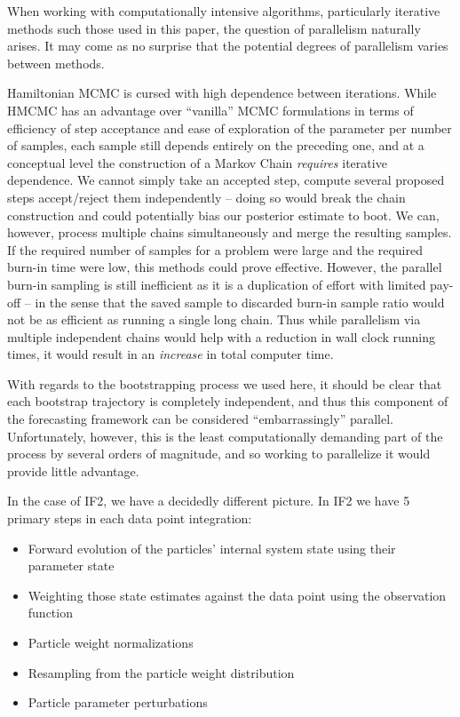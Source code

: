 	When working with computationally intensive algorithms, particularly iterative methods such those used in this paper, the question of parallelism naturally arises. It may come as no surprise that the potential degrees of parallelism varies between methods.

	Hamiltonian MCMC is cursed with high dependence between iterations. While HMCMC has an advantage over ``vanilla'' MCMC formulations in terms of efficiency of step acceptance and ease of exploration of the parameter per number of samples, each sample still depends entirely on the preceding one, and at a conceptual level the construction of a Markov Chain \textit{requires} iterative dependence. We cannot simply take an accepted step, compute several proposed steps accept/reject them independently -- doing so would break the chain construction and could potentially bias our posterior estimate to boot. We can, however, process multiple chains simultaneously and merge the resulting samples. If the required number of samples for a problem were large and the required burn-in time were low, this methods could prove effective. However, the parallel burn-in sampling is still inefficient as it is a duplication of effort with limited pay-off -- in the sense that the saved sample to discarded burn-in sample ratio would not be as efficient as running a single long chain. Thus while parallelism via multiple independent chains would help with a reduction in wall clock running times, it would result in an \textit{increase} in total computer time.

	With regards to the bootstrapping process we used here, it should be clear that each bootstrap trajectory is completely independent, and thus this component of the forecasting framework can be considered ``embarrassingly'' parallel. Unfortunately, however, this is the least computationally demanding part of the process by several orders of magnitude, and so working to parallelize it would provide little advantage.

	In the case of IF2, we have a decidedly different picture. In IF2 we have 5 primary steps in each data point integration: 

	\begin{itemize}
		\item Forward evolution of the particles' internal system state using their parameter state
		\item Weighting those state estimates against the data point using the observation function
		\item Particle weight normalizations
		\item Resampling from the particle weight distribution
		\item Particle parameter perturbations
	\end{itemize}

